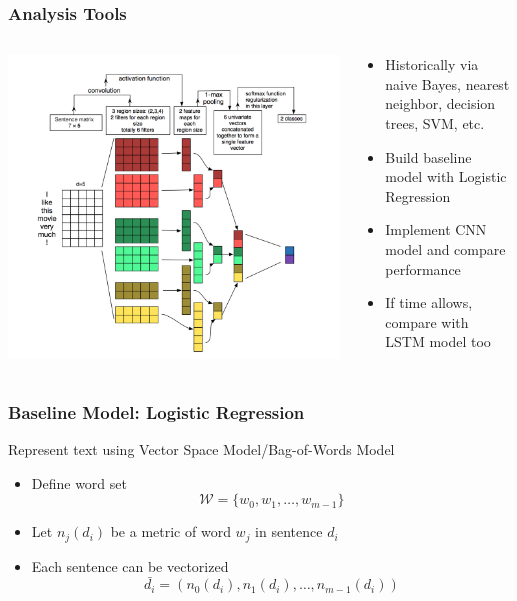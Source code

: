 \documentclass{beamer}
\begin{document}
\begin{frame}
\frametitle{Analysis Tools}
    \begin{columns}
    \begin{column}{0.5\textwidth}
    \center\includegraphics[width=\textwidth]{figure/sc_cnn}
    \end{column}
    \begin{column}{0.5\textwidth}
    \begin{itemize}
        \item Historically via naive Bayes, nearest neighbor, decision trees, SVM, etc.
        \item Build baseline model with Logistic Regression
        \item Implement CNN model and compare performance
        \item If time allows, compare with LSTM model too
    \end{itemize}
    \end{column}
    \end{columns}
\end{frame}

\begin{frame}
\frametitle{Baseline Model: Logistic Regression}
    Represent text using Vector Space Model/Bag-of-Words Model
    \begin{itemize}
        \item Define word set $$\mathcal{W}=\{w_0, w_1,\ldots, w_{m-1}\}$$
        \item Let $n_j(d_i)$ be a metric of word $w_j$ in sentence $d_i$
        \item Each sentence can be vectorized
        $$\bar{d_i}=(n_0(d_i),n_1(d_i),\ldots,n_{m-1}(d_i))$$
    \end{itemize}
\end{frame}
\end{document}
